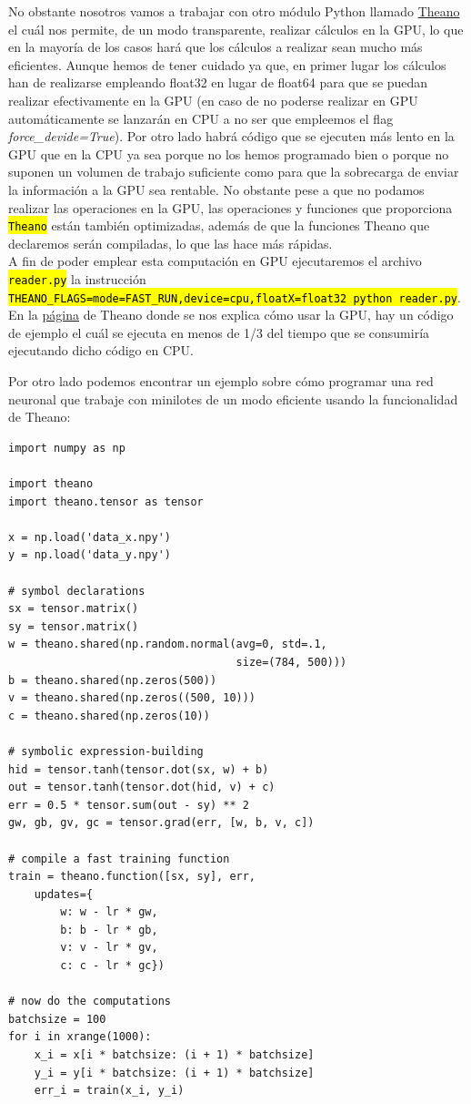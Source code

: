 \documentclass[10pt,a4paper]{article}
\newcommand{\code}[1]{\sethlcolor{light-gray}\hl{\texttt{#1}}} %
\newcommand{\archive}[1]{\sethlcolor{light-green}\hl{\texttt{#1}}} %
\begin{document}
No obstante nosotros vamos a trabajar con otro módulo Python llamado \href{http://deeplearning.net/software/theano/index.html}{Theano} el cuál nos permite, de un modo transparente, realizar cálculos en la GPU, lo que en la mayoría de los casos hará que los cálculos a realizar sean mucho más eficientes. Aunque hemos de tener cuidado ya que, en primer lugar los cálculos han de realizarse empleando float32 en lugar de float64 para que se puedan realizar efectivamente en la GPU (en caso de no poderse realizar en GPU automáticamente se lanzarán en CPU a no ser que empleemos el flag \textit{force\_devide=True}). Por otro lado habrá código que se ejecuten más lento en la GPU que en la CPU ya sea porque no los hemos programado bien o porque no suponen un volumen de trabajo suficiente como para que la sobrecarga de enviar la información a la GPU sea rentable. No obstante pese a que no podamos realizar las operaciones en la GPU, las operaciones y funciones que proporciona \code{Theano} están también optimizadas, además de que la funciones Theano que declaremos serán compiladas, lo que las hace más rápidas.\\

A fin de poder emplear esta computación en GPU ejecutaremos el archivo \archive{reader.py} la instrucción \code{THEANO\_FLAGS=mode=FAST\_RUN,device=cpu,floatX=float32 python reader.py}.\\

En la \href{http://deeplearning.net/software/theano/tutorial/using_gpu.html}{página} de Theano donde se nos explica cómo usar la GPU, hay un código de ejemplo el cuál se ejecuta en menos de 1/3 del tiempo que se consumiría ejecutando dicho código en CPU.

Por otro lado podemos encontrar un ejemplo sobre cómo programar una red neuronal que trabaje con minilotes de un modo eficiente usando la funcionalidad de Theano:

\begin{lstlisting}
import numpy as np

import theano
import theano.tensor as tensor

x = np.load('data_x.npy')
y = np.load('data_y.npy')

# symbol declarations
sx = tensor.matrix()
sy = tensor.matrix()
w = theano.shared(np.random.normal(avg=0, std=.1,
                                   size=(784, 500)))
b = theano.shared(np.zeros(500))
v = theano.shared(np.zeros((500, 10)))
c = theano.shared(np.zeros(10))

# symbolic expression-building
hid = tensor.tanh(tensor.dot(sx, w) + b)
out = tensor.tanh(tensor.dot(hid, v) + c)
err = 0.5 * tensor.sum(out - sy) ** 2
gw, gb, gv, gc = tensor.grad(err, [w, b, v, c])

# compile a fast training function
train = theano.function([sx, sy], err,
    updates={
        w: w - lr * gw,
        b: b - lr * gb,
        v: v - lr * gv,
        c: c - lr * gc})

# now do the computations
batchsize = 100
for i in xrange(1000):
    x_i = x[i * batchsize: (i + 1) * batchsize]
    y_i = y[i * batchsize: (i + 1) * batchsize]
    err_i = train(x_i, y_i)
\end{lstlisting}
\end{document}
